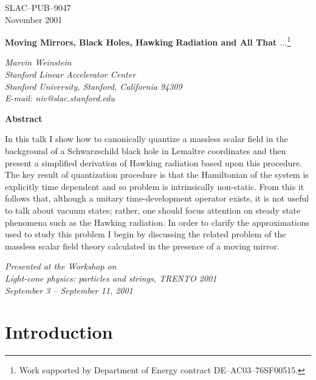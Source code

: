 \documentclass[12pt]{article}
\begin{document}
\begin{flushright}
{\small
SLAC--PUB--9047\\
November 2001\\}
\end{flushright}

\vfill

\begin{center}
{{\bf\Large Moving Mirrors, Black Holes, Hawking}
\vskip 20pt
{\bf\Large Radiation and
All That $\ldots$}\footnote{Work supported by Department
of Energy contract DE--AC03--76SF00515.}}

\bigskip
{\it Marvin Weinstein \\
Stanford Linear Accelerator Center \\
Stanford University, Stanford, California 94309 \\
E-mail:  niv@slac.stanford.edu}
\medskip
\end{center}

\vfill

\begin{center}
{\bf
Abstract }
\end{center}

In this talk I show how to
canonically quantize a massless scalar field in the 
background of a Schwarzschild black hole in Lema\^itre coordinates and
then present a simplified derivation of Hawking radiation based upon
this procedure.
The key result of quantization procedure is that 
the Hamiltonian of the system is explicitly time dependent and so 
problem is intrinsically non-static.
From this it follows that, although a unitary time-development operator exists,
it is not useful to talk about vacuum states; rather, one should
focus attention on steady state phenomena such as the
Hawking radiation.  In order to clarify the approximations used
to study this problem I begin by discussing the related
problem of the massless scalar field theory calculated in the
presence of a moving mirror.

\vfill

\begin{center}
{\it Presented at the Workshop on \\
Light-cone physics: particles and
strings, TRENTO 2001\\
September 3 -- September 11, 2001 }\\
\end{center}

\vfill \newpage




\section{Introduction}
\end{document}
